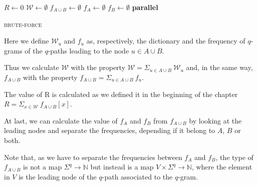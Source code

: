 \begin{algorithm}[h]
	\small
	\DontPrintSemicolon
	\BlankLine
	$R \gets 0$\;
	$\mathcal{W} \gets \emptyset$\;
	$f_{A \cup B} \gets \emptyset$ \quad \;    
	$f_{A} \gets \emptyset$\; 
	$f_{B} \gets \emptyset$\; 
	\BlankLine
	\textbf{parallel} 
	\BlankLine    
	\BlankLine
	\caption{\textsc{brute-force}}
	\label{alg:brute-force}
\end{algorithm}

Here we define $\mathcal{W}_{u}$ and $f_{u}$ as, respectively, the dictionary and the frequency of $q$-grams of the $q$-paths leading to the node $u \in A \cup B$.
	 
Thus we calculate $\mathcal{W}$ with the property $\mathcal{W} = \Sigma_{u \in A \cup B}{\ \mathcal{W}_{u} }$ and, in the same way, $f_{A \cup B}$ with the property $f_{A \cup B} = \Sigma_{u \in A \cup B}{\ f_{u} }$.
	
The value of R is calculated as we defined it in the beginning of the chapter $R = \Sigma_{x \in \mathcal{W} }{\ f_{A \cup B}[x] }$.

At last, we can calculate the value of $f_{A}$ and $f_{B}$ from $f_{A \cup B}$ by looking at the leading nodes and separate the frequencies, depending if it belong to $A$, $B$ or both.

Note that, as we have to separate the frequencies between $f_{A}$ and $f_{B}$, the type of $f_{A \cup B}$ is not a map $ \Sigma^{q} \rightarrow \mathbb{N}$ but instead is a map $V \times \Sigma^{q} \rightarrow \mathbb{N}$, where the element in $V$ is the leading node of the $q$-path associated to the $q$-gram.\medskip
	
